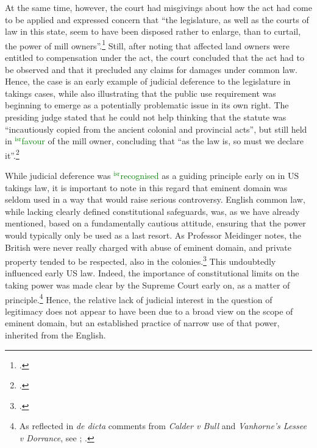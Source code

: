 \documentclass[12pt,a4paper]{book} %
\newcommand{\isr}[1]{\textcolor{green}{$^{\textrm{isr}}${#1}}}
\begin{document}
At the same time, however, the court had misgivings about how the act had come to be applied and expressed concern that ``the legislature, as well as the courts of law in this state, seem to have been disposed rather to enlarge, than to curtail, the power of mill owners''.\footcite[366]{stowell14} Still, after noting that affected land owners were entitled to compensation under the act, the court concluded that the act had to be observed and that it precluded any claims for damages under common law. Hence, the case is an early example of judicial deference to the legislature in takings cases, while also illustrating that the public use requirement was beginning to emerge as a potentially problematic issue in its own right. The presiding judge stated that he could not help thinking that the statute was ``incautiously copied from the ancient colonial and provincial acts'', but still held in \isr{favour} of the mill owner,  concluding that ``as the law is, so must we declare it''.\footcite[368]{stowell14}

While judicial deference was \isr{recognised} as a guiding principle early on in US takings law, it is important to note in this regard that eminent domain was seldom used in a way that would raise serious controversy. English common law, while lacking clearly defined constitutional safeguards, was, as we have already mentioned, based on a fundamentally cautious attitude, ensuring that the power would typically only be used as a last resort. As Professor Meidinger notes, the British were never really charged with abuse of eminent domain, and private property tended to be respected, also in the colonies.\footcite[17]{meidinger80} This undoubtedly influenced early US law. Indeed, the importance of constitutional limits on the taking power was made clear by the Supreme Court early on, as a matter of principle.\footnote{As reflected in {\it de dicta} comments from {\it Calder v Bull} and {\it Vanhorne’s Lessee v Dorrance}, see \cite[388]{calder98}; \cite[310]{vanhorne95}.} Hence, the relative lack of judicial interest in the question of legitimacy does not appear to have been due to a broad view on the scope of eminent domain, but an established practice of narrow use of that power, inherited from the English.
\end{document}
